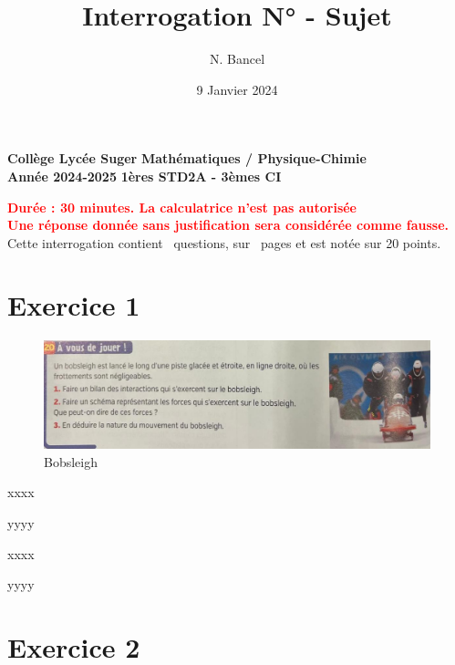 \documentclass[answers]{exam}
\title{Interrogation N° - Sujet}
\author{N. Bancel}
\date{9 Janvier 2024}
\begin{document}
\textbf{Collège Lycée Suger}
\hfill
\textbf{Mathématiques / Physique-Chimie} \\

\textbf{Année 2024-2025}
\hfill
\textbf{1ères STD2A - 3èmes CI} \par

{\let\newpage\relax\maketitle}

  
  {\let\newpage\relax\maketitle}

  \begin{center}
  \textbf{\textcolor{red}{Durée : 30 minutes. La calculatrice n'est pas autorisée}} \\
  \textbf{\textcolor{red}{Une réponse donnée sans justification sera considérée comme fausse.}} \\
  Cette interrogation contient \numquestions\ questions, sur \numpages\ pages et est notée sur 20 points. 
  
  \end{center}

\section*{Exercice 1}

\begin{figure}[H]
  \centering
  \includegraphics[width=0.5\linewidth]{img/test.jpg}
  \captionsetup{labelformat=empty}
  \caption{\label{} Bobsleigh}
\end{figure}

\begin{questions}

  \question[3] xxxx

  \begin{solution}
    yyyy
  \end{solution}

\question[3] xxxx

\begin{solution}
  yyyy
\end{solution}

\end{questions}


\section*{Exercice 2}
\end{document}
